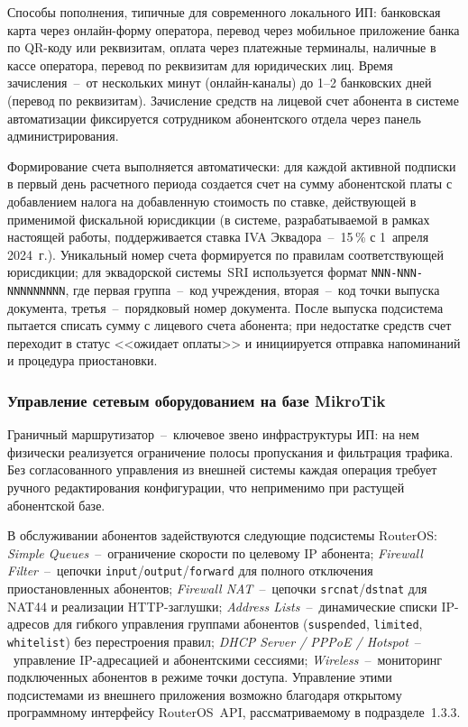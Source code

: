 Способы пополнения, типичные для современного локального ИП: банковская карта через онлайн-форму оператора, перевод через мобильное приложение банка по QR-коду или реквизитам, оплата через платежные терминалы, наличные в кассе оператора, перевод по реквизитам для юридических лиц. Время зачисления~--~от нескольких минут (онлайн-каналы) до 1--2 банковских дней (перевод по реквизитам). Зачисление средств на лицевой счет абонента в системе автоматизации фиксируется сотрудником абонентского отдела через панель администрирования.

Формирование счета выполняется автоматически: для каждой активной подписки в первый день расчетного периода создается счет на сумму абонентской платы с добавлением налога на добавленную стоимость по ставке, действующей в применимой фискальной юрисдикции (в системе, разрабатываемой в рамках настоящей работы, поддерживается ставка IVA Эквадора~--~15\,\% с 1~апреля 2024~г.). Уникальный номер счета формируется по правилам соответствующей юрисдикции; для эквадорской системы~SRI используется формат \texttt{NNN-NNN-NNNNNNNNN}, где первая группа~--~код учреждения, вторая~--~код точки выпуска документа, третья~--~порядковый номер документа. После выпуска подсистема пытается списать сумму с лицевого счета абонента; при недостатке средств счет переходит в статус <<ожидает оплаты>> и инициируется отправка напоминаний и процедура приостановки.

\subsubsection{Управление сетевым оборудованием на базе MikroTik}

Граничный маршрутизатор~--~ключевое звено инфраструктуры ИП: на нем физически реализуется ограничение полосы пропускания и фильтрация трафика. Без согласованного управления из внешней системы каждая операция требует ручного редактирования конфигурации, что неприменимо при растущей абонентской базе.

В обслуживании абонентов задействуются следующие подсистемы RouterOS: \emph{Simple Queues}~--~ограничение скорости по целевому IP абонента; \emph{Firewall Filter}~--~цепочки \texttt{input}/\texttt{output}/\texttt{forward} для полного отключения приостановленных абонентов; \emph{Firewall NAT}~--~цепочки \texttt{srcnat}/\texttt{dstnat} для NAT44 и реализации HTTP-заглушки; \emph{Address Lists}~--~динамические списки IP-адресов для гибкого управления группами абонентов (\texttt{suspended}, \texttt{limited}, \texttt{whitelist}) без перестроения правил; \emph{DHCP Server / PPPoE / Hotspot}~--~управление IP-адресацией и абонентскими сессиями; \emph{Wireless}~--~мониторинг подключенных абонентов в режиме точки доступа. Управление этими подсистемами из внешнего приложения возможно благодаря открытому программному интерфейсу RouterOS~API, рассматриваемому в подразделе~1.3.3.

